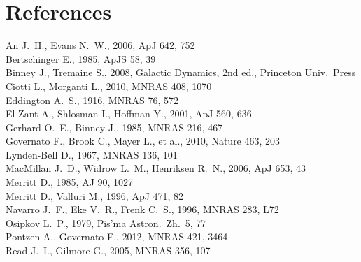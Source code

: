 \documentclass[11pt,a4paper]{article}
\begin{document}
\section*{References}
\begin{small}
\noindent
An J.~H., Evans N.~W., 2006, ApJ 642, 752\\
Bertschinger E., 1985, ApJS 58, 39\\
Binney J., Tremaine S., 2008, Galactic Dynamics, 2nd ed., Princeton Univ.\ Press\\
Ciotti L., Morganti L., 2010, MNRAS 408, 1070\\
Eddington A.~S., 1916, MNRAS 76, 572\\
El-Zant A., Shlosman I., Hoffman Y., 2001, ApJ 560, 636\\
Gerhard O.~E., Binney J., 1985, MNRAS 216, 467\\
Governato F., Brook C., Mayer L., et al., 2010, Nature 463, 203\\
Lynden-Bell D., 1967, MNRAS 136, 101\\
MacMillan J.~D., Widrow L.~M., Henriksen R.~N., 2006, ApJ 653, 43\\
Merritt D., 1985, AJ 90, 1027\\
Merritt D., Valluri M., 1996, ApJ 471, 82\\
Navarro J.~F., Eke V.~R., Frenk C.~S., 1996, MNRAS 283, L72\\
Osipkov L.~P., 1979, Pis'ma Astron.\ Zh.\ 5, 77\\
Pontzen A., Governato F., 2012, MNRAS 421, 3464\\
Read J.~I., Gilmore G., 2005, MNRAS 356, 107
\end{small}
\end{document}
